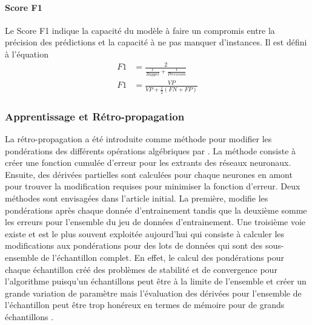       \paragraph{Score F1} Le Score F1 indique la capacité du modèle à faire un compromis entre la précision des prédictions et la capacité à ne pas manquer d'instances. Il est défini à l'équation 
      \begin{align}
        F1 & = \frac{2}{\frac{1}{Rappel} + \frac{1}{Precision}}\label{eq:F1_1}\\
        F1 & = \frac{VP}{VP + \frac{1}{2} (FN + FP)}
      \end{align}
    \subsubsection{Apprentissage et Rétro-propagation}
      La rétro-propagation a été introduite comme méthode pour modifier les pondérations des différents opérations algébriques par \textcite{Rumelhart:LearningRepresentations:1986}. La méthode consiste à créer une fonction cumulée d'erreur pour les extrants des réseaux neuronaux. Ensuite, des dérivées partielles sont calculées pour chaque neurones en amont pour trouver la modification requises pour minimiser la fonction d'erreur. Deux méthodes sont envisagées dans l'article initial. La première, modifie les pondérations après chaque donnée d'entrainement tandis que la deuxième somme les erreurs pour l'ensemble du jeu de données d'entrainement. Une troisième voie existe et est le plus souvent exploitée aujourd'hui qui consiste à calculer les modifications aux pondérations pour des lots de données qui sont des sous-ensemble de l'échantillon complet. En effet, le calcul des pondérations pour chaque échantillon créé des problèmes de stabilité et de convergence pour l'algorithme puisqu'un échantillons peut être à la limite de l'ensemble et créer un grande variation de paramètre mais l'évaluation des dérivées pour l'ensemble de l'échantillon peut être trop honéreux en termes de mémoire pour de grands échantillons \parencite{Wallach:DeepLearning:2024}.\par
      
